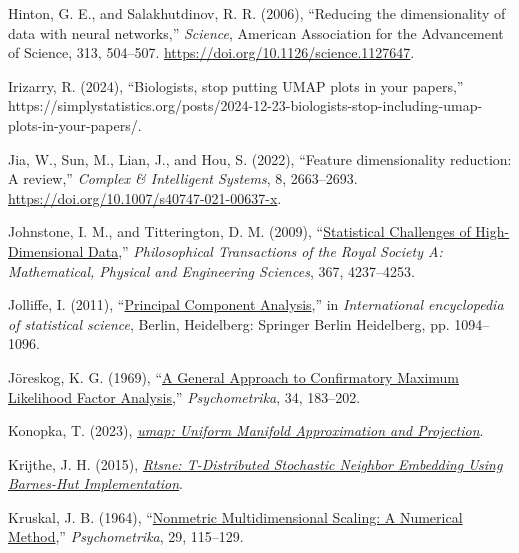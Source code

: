 \documentclass[
  11pt,
  a4paper,
]{report}
\newlength{\cslhangindent}
\newenvironment{CSLReferences}[2] %
 {\begin{list}{}{%
  \setlength{\itemindent}{0pt}
  \setlength{\leftmargin}{0pt}
  \setlength{\parsep}{0pt}
  \ifodd #1
   \setlength{\leftmargin}{\cslhangindent}
   \setlength{\itemindent}{-1\cslhangindent}
  \fi
  \setlength{\itemsep}{#2\baselineskip}}}
 {\end{list}}
\begin{document}
\begin{CSLReferences}{1}{0}
Hinton, G. E., and Salakhutdinov, R. R. (2006), {``Reducing the
dimensionality of data with neural networks,''} \emph{Science}, American
Association for the Advancement of Science, 313, 504--507.
\url{https://doi.org/10.1126/science.1127647}.

Irizarry, R. (2024), {``Biologists, stop putting UMAP plots in your
papers,''}
https://simplystatistics.org/posts/2024-12-23-biologists-stop-including-umap-plots-in-your-papers/.

Jia, W., Sun, M., Lian, J., and Hou, S. (2022), {``Feature
dimensionality reduction: A review,''} \emph{Complex \& Intelligent
Systems}, 8, 2663--2693.
\url{https://doi.org/10.1007/s40747-021-00637-x}.

Johnstone, I. M., and Titterington, D. M. (2009),
{``\href{/url\%7Bhttps://royalsocietypublishing.org/doi/abs/10.1098/rsta.2009.0159\%7D.}{{Statistical
Challenges of High-Dimensional Data}},''} \emph{Philosophical
Transactions of the Royal Society A: Mathematical, Physical and
Engineering Sciences}, 367, 4237--4253.

Jolliffe, I. (2011),
{``\href{/url\%7Bhttps://doi.org/10.1007/978-3-642-04898-2_455\%7D.}{{Principal
Component Analysis}},''} in \emph{International encyclopedia of
statistical science}, Berlin, Heidelberg: Springer Berlin Heidelberg,
pp. 1094--1096.

Jöreskog, K. G. (1969),
{``\href{/url\%7Bhttps://doi.org/10.1007/BF02289343\%7D.}{{A General
Approach to Confirmatory Maximum Likelihood Factor Analysis}},''}
\emph{Psychometrika}, 34, 183--202.

Konopka, T. (2023),
\emph{\href{/url\%7Bhttps://CRAN.R-project.org/package=umap\%7D.}{{umap:
Uniform Manifold Approximation and Projection}}}.

Krijthe, J. H. (2015),
\emph{\href{/url\%7Bhttps://github.com/jkrijthe/Rtsne\%7D.}{{Rtsne:
T-Distributed Stochastic Neighbor Embedding Using Barnes-Hut
Implementation}}}.

Kruskal, J. B. (1964),
{``\href{/url\%7Bhttps://doi.org/10.1007/BF02289694\%7D.}{{Nonmetric
Multidimensional Scaling: A Numerical Method}},''} \emph{Psychometrika},
29, 115--129.


\end{CSLReferences}
\end{document}
